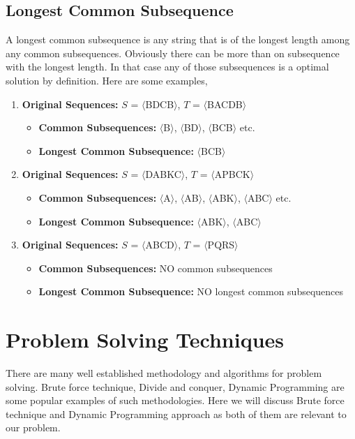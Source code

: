 \documentclass{report}
\begin{document}
\section{Longest Common Subsequence}{
\bigskip
A longest common subsequence is any string that is of the longest length among any common subsequences. Obviously there can be more than on subsequence with the longest length. In that case any of those subsequences is a optimal solution by definition. Here are some examples,
\begin{enumerate}
    \bigskip
    \item {\textbf{Original Sequences:} $S$ = $\langle$BDCB$\rangle$,  $T$ = $\langle$BACDB$\rangle$}
        \begin{itemize}
            \item {\textbf{Common Subsequences:} $\langle$B$\rangle$, $\langle$BD$\rangle$, $\langle$BCB$\rangle$ etc.}
            \item {\textbf{Longest Common Subsequence:} $\langle$BCB$\rangle$}
        \end{itemize}
    \bigskip
    \item {\textbf{Original Sequences:}} $S$ = $\langle$DABKC$\rangle$,  $T$ = $\langle$APBCK$\rangle$
        \begin{itemize}
            \item \textbf{Common Subsequences:} $\langle$A$\rangle$, $\langle$AB$\rangle$, $\langle$ABK$\rangle$, $\langle$ABC$\rangle$ etc.
            \item \textbf{Longest Common Subsequence:} $\langle$ABK$\rangle$, $\langle$ABC$\rangle$
        \end{itemize}
    \bigskip
    \item {\textbf{Original Sequences:}} $S$ = $\langle$ABCD$\rangle$,  $T$ = $\langle$PQRS$\rangle$
        \begin{itemize}
            \item \textbf{Common Subsequences:} NO common subsequences
            \item \textbf{Longest Common Subsequence:} NO longest common subsequences
        \end{itemize}
\end{enumerate}    
    

}

\newpage


\chapter{Problem Solving Techniques}
\bigskip
There are many well established methodology and algorithms for problem solving.
Brute force technique, Divide and conquer, Dynamic Programming are some popular examples of such methodologies. Here we will discuss Brute force technique and Dynamic Programming approach as both of them are relevant to our problem.
\bigskip
\end{document}
